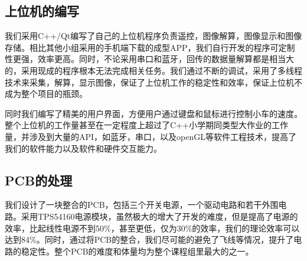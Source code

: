 \documentclass[a4paper]{paper}
\begin{document}
\subsection{上位机的编写}
我们采用C++/Qt编写了自己的上位机程序负责遥控，图像解算，图像显示和图像存储。相比其他小组采用的手机端下载的成型APP，我们自行开发的程序可定制性更强，效率更高。同时，不论采用串口和蓝牙，回传的数据量解算都是相当大的，采用现成的程序根本无法完成相关任务。我们通过不断的调试，采用了多线程技术来采集，解算，显示图像，保证了上位机工作的稳定性和效率，保证上位机不成为整个项目的瓶颈。

同时我们编写了精美的用户界面，方便用户通过键盘和鼠标进行控制小车的速度。整个上位机的工作量甚至在一定程度上超过了C++小学期同类型大作业的工作量，并涉及到大量的API，如蓝牙，串口，以及openGL等软件工程技术，提高了我们的软件能力以及软件和硬件交互能力。
\subsection{PCB的处理}
我们设计了一块整合的PCB，包括三个开关电源，一个驱动电路和若干外围电路。采用TPS54160电源模块，虽然极大的增大了开发的难度，但是提高了电源的效率，比起线性电源不到50\%，甚至更低，仅为30\%的效率，我们的理论效率可以达到84\%。同时，通过将PCB的整合，我们尽可能的避免了飞线等情况，提升了电路的稳定性。整个PCB的难度和体量均为整个课程组里最大的之一。
\end{document}
